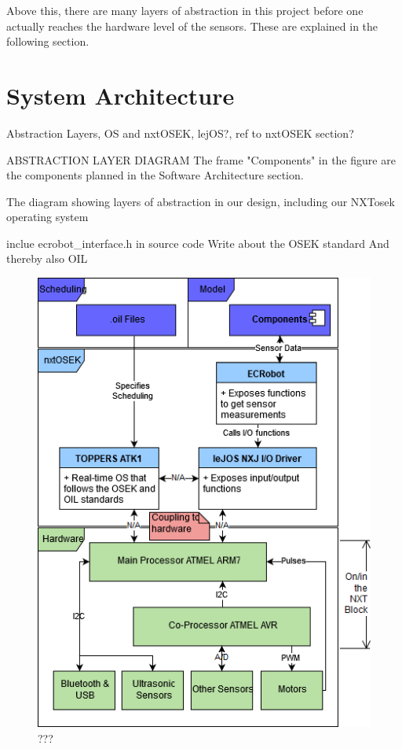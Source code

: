 Above this, there are many layers of abstraction in this project before one actually reaches the hardware level of the sensors. These are explained in the following section. 

\section{System Architecture}

Abstraction Layers, OS and nxtOSEK, lejOS?, ref to nxtOSEK section?

ABSTRACTION LAYER DIAGRAM
The frame "Components" in the figure are the components planned in the Software Architecture section. 

The diagram showing layers of abstraction in our design, including our NXTosek operating system

inclue ecrobot\_interface.h in source code
Write about the OSEK standard
And thereby also OIL
\begin{figure}[H]
    \includegraphics[width=\textwidth]{Images/Design/abstractionLayerDiagram.png}
    \caption{???}
\end{figure}

